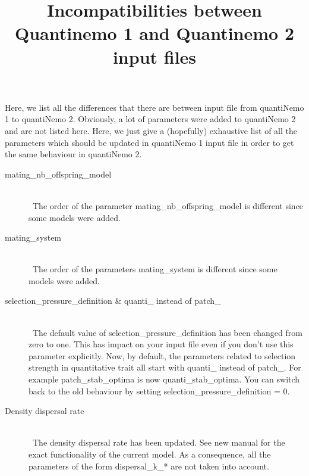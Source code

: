 \documentclass[letterpaper,12pt,oneside]{article}
\begin{document}
\title{Incompatibilities between Quantinemo 1 and Quantinemo 2 input files}
\maketitle
Here, we list all the differences that there are between input file from quantiNemo 1 to quantiNemo 2. Obviously, a lot of parameters were added to quantiNemo 2 and are not listed here. Here, we just give a (hopefully) exhaustive list of all the parameters which should be updated in quantiNemo 1 input file in order to get the same behaviour in quantiNemo 2. 
\begin{description}
\item[mating\_nb\_offspring\_model ]\hspace*{\fill}\\\
The order of the parameter \textsf{mating\_nb\_offspring\_model} is different since some models were added. 

\item[mating\_system]\hspace*{\fill}\\\
The order of the parameters \textsf{mating\_system} is different since some models were added. 

\item[selection\_pressure\_definition \& quanti\_ instead of patch\_]\hspace*{\fill}\\\
The default value of  \textsf{selection\_pressure\_definition} has been changed from zero to one. This has impact on your input file even if you don't use this parameter explicitly. Now, by default, the parameters related to selection strength in quantitative trait all start with \textsf{quanti\_} instead of \textsf{patch\_}. For example \textsf{patch\_stab\_optima} is now \textsf{quanti\_stab\_optima}. You can switch back to the old behaviour by setting \textsf{selection\_pressure\_definition = 0}.

\item[Density dispersal rate]\hspace*{\fill}\\\
The density dispersal rate has been updated. See new manual for the exact functionality of the current model. As a consequence, all the parameters of the form \textsf{dispersal\_k\_*} are not taken into account. 

\end{description}
\end{document}
